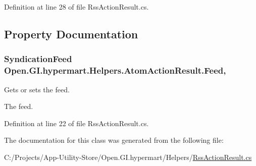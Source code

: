 Definition at line 28 of file Rss\+Action\+Result.\+cs.



\subsection{Property Documentation}
\hypertarget{class_open_1_1_g_i_1_1hypermart_1_1_helpers_1_1_atom_action_result_a17a5a951bdf5ed9f8a93f24843e124ca}{}
\subsubsection[{Feed}]{\setlength{\rightskip}{0pt plus 5cm}Syndication\+Feed Open.\+G\+I.\+hypermart.\+Helpers.\+Atom\+Action\+Result.\+Feed\hspace{0.3cm}{\ttfamily [get]}, {\ttfamily [set]}}\label{class_open_1_1_g_i_1_1hypermart_1_1_helpers_1_1_atom_action_result_a17a5a951bdf5ed9f8a93f24843e124ca}


Gets or sets the feed. 

The feed. 

Definition at line 22 of file Rss\+Action\+Result.\+cs.



The documentation for this class was generated from the following file\+:\begin{DoxyCompactItemize}
\item 
C\+:/\+Projects/\+App-\/\+Utility-\/\+Store/\+Open.\+G\+I.\+hypermart/\+Helpers/\hyperlink{_rss_action_result_8cs}{Rss\+Action\+Result.\+cs}\end{DoxyCompactItemize}
